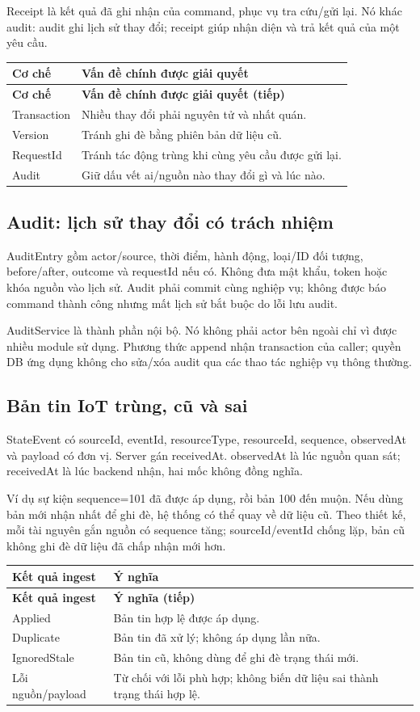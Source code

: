\documentclass[12pt,a4paper]{article}
\newenvironment{PairTable}[2]{%
  \begin{longtable}{|L{39mm}|L{106mm}|}\hline
  \textbf{#1} & \textbf{#2}\\\hline\endfirsthead
  \hline\textbf{#1} & \textbf{#2 (tiếp)}\\\hline\endhead
}{\end{longtable}}
\begin{document}
Receipt là kết quả đã ghi nhận của command, phục vụ tra cứu/gửi lại. Nó khác audit: audit ghi lịch sử thay đổi; receipt giúp nhận diện và trả kết quả của một yêu cầu.

\begin{PairTable}{Cơ chế}{Vấn đề chính được giải quyết}
Transaction & Nhiều thay đổi phải nguyên tử và nhất quán.\\\hline
Version & Tránh ghi đè bằng phiên bản dữ liệu cũ.\\\hline
RequestId & Tránh tác động trùng khi cùng yêu cầu được gửi lại.\\\hline
Audit & Giữ dấu vết ai/nguồn nào thay đổi gì và lúc nào.\\\hline
\end{PairTable}

\subsection{Audit: lịch sử thay đổi có trách nhiệm}
AuditEntry gồm actor/source, thời điểm, hành động, loại/ID đối tượng, before/after, outcome và requestId nếu có. Không đưa mật khẩu, token hoặc khóa nguồn vào lịch sử. Audit phải commit cùng nghiệp vụ; không được báo command thành công nhưng mất lịch sử bắt buộc do lỗi lưu audit.

AuditService là thành phần nội bộ. Nó không phải actor bên ngoài chỉ vì được nhiều module sử dụng. Phương thức append nhận transaction của caller; quyền DB ứng dụng không cho sửa/xóa audit qua các thao tác nghiệp vụ thông thường.

\subsection{Bản tin IoT trùng, cũ và sai}
StateEvent có sourceId, eventId, resourceType, resourceId, sequence, observedAt và payload có đơn vị. Server gán receivedAt. observedAt là lúc nguồn quan sát; receivedAt là lúc backend nhận, hai mốc không đồng nghĩa.

Ví dụ sự kiện sequence=101 đã được áp dụng, rồi bản 100 đến muộn. Nếu dùng bản mới nhận nhất để ghi đè, hệ thống có thể quay về dữ liệu cũ. Theo thiết kế, mỗi tài nguyên gắn nguồn có sequence tăng; sourceId/eventId chống lặp, bản cũ không ghi đè dữ liệu đã chấp nhận mới hơn.

\begin{PairTable}{Kết quả ingest}{Ý nghĩa}
Applied & Bản tin hợp lệ được áp dụng.\\\hline
Duplicate & Bản tin đã xử lý; không áp dụng lần nữa.\\\hline
IgnoredStale & Bản tin cũ, không dùng để ghi đè trạng thái mới.\\\hline
Lỗi nguồn/payload & Từ chối với lỗi phù hợp; không biến dữ liệu sai thành trạng thái hợp lệ.\\\hline
\end{PairTable}
\end{document}

